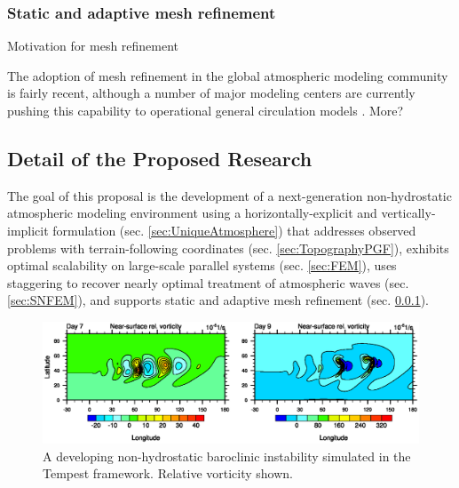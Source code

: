 \documentclass[11pt]{article}
\begin{document}
\subsubsection{Static and adaptive mesh refinement} \label{sec:Refinement}

{\color{blue} Motivation for mesh refinement}

The adoption of mesh refinement in the global atmospheric modeling community is fairly recent, although a number of major modeling centers are currently pushing this capability to operational general circulation models \citep{skamarock2012mpas, LMHSJL2013MWR, CMZCJMAT2013MWR}.  {\color{blue} More?}

\subsection{Detail of the Proposed Research} \label{sec:Research}

The goal of this proposal is the development of a next-generation non-hydrostatic atmospheric modeling environment using a horizontally-explicit and vertically-implicit formulation (sec. \ref{sec:UniqueAtmosphere}) that addresses observed problems with terrain-following coordinates (sec. \ref{sec:TopographyPGF}), exhibits optimal scalability on large-scale parallel systems (sec. \ref{sec:FEM}), uses staggering to recover nearly optimal treatment of atmospheric waves (sec. \ref{sec:SNFEM}), and supports static and adaptive mesh refinement (sec. \ref{sec:Refinement}).

\begin{figure}
\begin{center}
\includegraphics[width=6in]{UMJSTest-Results}
\end{center}
\caption{A developing non-hydrostatic baroclinic instability simulated in the Tempest framework.  Relative vorticity shown.} \label{fig:TempestBaroclinicInstability}
\end{figure}
\end{document}
